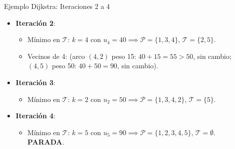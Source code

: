 \documentclass[
  ignorenonframetext,
]{beamer}
\providecommand{\tightlist}{%
  \setlength{\itemsep}{0pt}\setlength{\parskip}{0pt}}
\begin{document}
\begin{frame}{Ejemplo Dijkstra: Iteraciones 2 a 4}
\label{ejemplo-dijkstra-iteraciones-2-a-4}
\begin{itemize}
\tightlist
\item
  \textbf{Iteración 2}:

  \begin{itemize}
  \tightlist
  \item
    Mínimo en \(\mathcal{T}\): \(k = 4\) con
    \(u_4 = 40 \implies \mathcal{P} = \{1, 3, 4\}\),
    \(\mathcal{T} = \{2, 5\}\).
  \item
    Vecinos de 4: (arco \((4,2)\) peso 15: \(40+15=55 > 50\), sin
    cambio; \((4,5)\) peso 50: \(40+50=90\), sin cambio).
  \end{itemize}
\item
  \textbf{Iteración 3}:

  \begin{itemize}
  \tightlist
  \item
    Mínimo en \(\mathcal{T}\): \(k = 2\) con
    \(u_2 = 50 \implies \mathcal{P} = \{1, 3, 4, 2\}\),
    \(\mathcal{T} = \{5\}\).
  \end{itemize}
\item
  \textbf{Iteración 4}:

  \begin{itemize}
  \tightlist
  \item
    Mínimo en \(\mathcal{T}\): \(k = 5\) con
    \(u_5 = 90 \implies \mathcal{P} = \{1, 2, 3, 4, 5\}\),
    \(\mathcal{T} = \emptyset\). \textbf{PARADA}.
  \end{itemize}
\end{itemize}
\end{frame}
\end{document}
